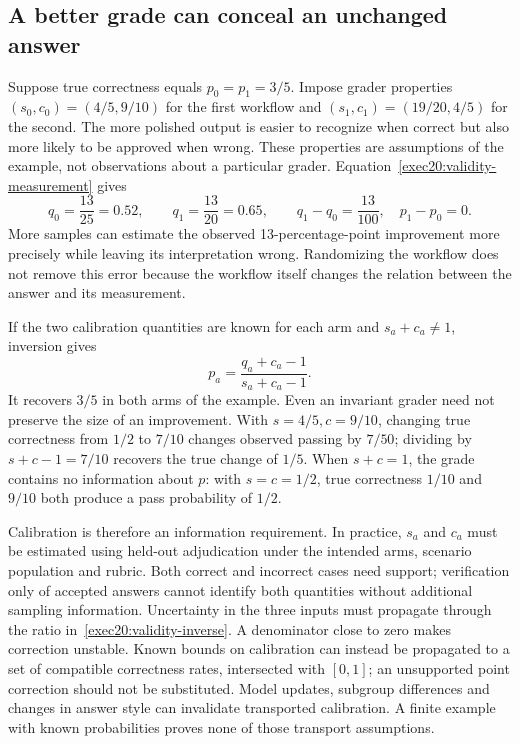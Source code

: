 \subsection{A better grade can conceal an unchanged answer}
\label{exec20:validity-example}

Suppose true correctness equals $p_0=p_1=3/5$. Impose grader properties
$(s_0,c_0)=(4/5,9/10)$ for the first workflow and
$(s_1,c_1)=(19/20,4/5)$ for the second. The more polished output is easier to
recognize when correct but also more likely to be approved when wrong. These
properties are assumptions of the example, not observations about a particular
grader. Equation~\eqref{exec20:validity-measurement} gives
\begin{equation}
 q_0=\frac{13}{25}=0.52,\qquad
 q_1=\frac{13}{20}=0.65,\qquad
 q_1-q_0=\frac{13}{100},\quad p_1-p_0=0.
 \label{exec20:validity-illusion}
\end{equation}
More samples can estimate the observed 13-percentage-point improvement more
precisely while leaving its interpretation wrong. Randomizing the workflow
does not remove this error because the workflow itself changes the relation
between the answer and its measurement.

If the two calibration quantities are known for each arm and
$s_a+c_a\ne1$, inversion gives
\begin{equation}
 p_a=\frac{q_a+c_a-1}{s_a+c_a-1}.
 \label{exec20:validity-inverse}
\end{equation}
It recovers $3/5$ in both arms of the example. Even an invariant grader need
not preserve the size of an improvement. With $s=4/5,c=9/10$, changing true
correctness from $1/2$ to $7/10$ changes observed passing by $7/50$; dividing
by $s+c-1=7/10$ recovers the true change of $1/5$. When $s+c=1$, the grade
contains no information about $p$: with $s=c=1/2$, true correctness $1/10$
and $9/10$ both produce a pass probability of $1/2$.
\citep{exec20_validity_reference}

Calibration is therefore an information requirement. In practice, $s_a$ and
$c_a$ must be estimated using held-out adjudication under the intended arms,
scenario population and rubric. Both correct and incorrect cases need support;
verification only of accepted answers cannot identify both quantities without
additional sampling information. Uncertainty in the three inputs must propagate
through the ratio in~\eqref{exec20:validity-inverse}. A denominator close to
zero makes correction unstable. Known bounds on calibration can instead be
propagated to a set of compatible correctness rates, intersected with $[0,1]$;
an unsupported point correction should not be substituted. Model updates,
subgroup differences and changes in answer style can invalidate transported
calibration. A finite example with known probabilities proves none of those
transport assumptions.

